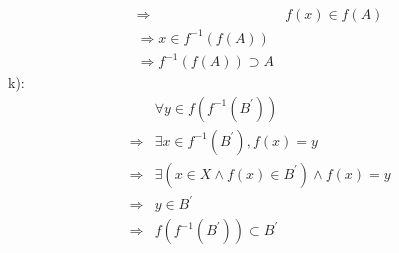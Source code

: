 \begin{solution}
\begin{align*}
\Rightarrow& f(x)\in f(A)\\
\Rightarrow x\in f^{-1}(f(A))\\
\Rightarrow f^{-1}(f(A))\supset A
\end{align*}
k):\\
\begin{align*}
&\forall y\in f(f^{-1}(B^\prime))\\
\Rightarrow& \exists x\in f^{-1}(B^\prime),f(x)=y\\
\Rightarrow& \exists (x\in X\land f(x)\in B^\prime)\land f(x)=y\\
\Rightarrow& y\in B^\prime\\
\Rightarrow& f(f^{-1}(B^\prime))\subset B^\prime
\end{align*}
\end{solution}